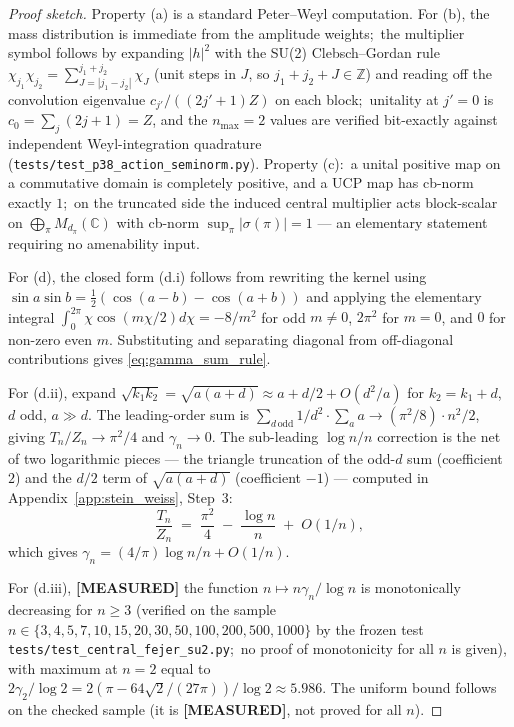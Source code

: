 \documentclass[11pt,a4paper]{article}
\theoremstyle{plain}
\theoremstyle{definition}
\newcommand{\nmax}{n_{\max}}
\newcommand{\C}{\mathbb{C}}
\newcommand{\Mat}{M}
\begin{document}
\begin{proof}[Proof sketch]
Property (a) is a standard Peter--Weyl computation. For (b), the mass
distribution is immediate from the amplitude weights;\ the multiplier
symbol follows by expanding $|h|^{2}$ with the SU(2) Clebsch--Gordan
rule $\chi_{j_1}\chi_{j_2} = \sum_{J = |j_1 - j_2|}^{j_1+j_2}\chi_{J}$
(unit steps in $J$, so $j_1 + j_2 + J \in \mathbb{Z}$)
and reading off the convolution eigenvalue
$c_{j'}/((2j'+1)Z)$ on each block;\ unitality at $j' = 0$ is
$c_{0} = \sum_{j}(2j+1) = Z$, and the $\nmax = 2$ values are verified
bit-exactly against independent Weyl-integration quadrature
(\texttt{tests/test\_p38\_action\_seminorm.py}). Property (c):\ a unital positive map on a
commutative domain is completely positive, and a UCP map has cb-norm
exactly $1$;\ on the truncated side the induced central multiplier
acts block-scalar on $\bigoplus_{\pi}\Mat_{d_{\pi}}(\C)$ with cb-norm
$\sup_{\pi}|\sigma(\pi)| = 1$ — an elementary statement requiring no
amenability input.

For (d), the closed form (d.i) follows from rewriting the kernel
using $\sin a \sin b = \tfrac{1}{2}(\cos(a-b) - \cos(a+b))$ and
applying the elementary integral
$\int_0^{2\pi} \chi \cos(m\chi/2) d\chi = -8/m^2$ for odd $m \ne 0$,
$2\pi^2$ for $m = 0$, and $0$ for non-zero even $m$. Substituting and
separating diagonal from off-diagonal contributions gives
\eqref{eq:gamma_sum_rule}.

For (d.ii), expand
$\sqrt{k_1 k_2} = \sqrt{a(a+d)} \approx a + d/2 + O(d^2/a)$ for
$k_2 = k_1 + d$, $d$ odd, $a \gg d$. The leading-order sum is
$\sum_{d\,\mathrm{odd}} 1/d^2 \cdot \sum_a a \to (\pi^2/8) \cdot
n^2/2$, giving $T_n / Z_n \to \pi^2/4$ and $\gamma_n \to 0$. The
sub-leading $\log n / n$ correction is the net of two logarithmic
pieces --- the triangle truncation of the odd-$d$ sum (coefficient
$2$) and the $d/2$ term of $\sqrt{a(a+d)}$ (coefficient $-1$) ---
computed in Appendix~\ref{app:stein_weiss}, Step~3:
\begin{equation*}
   \frac{T_n}{Z_n}
   \;=\; \frac{\pi^2}{4} \;-\; \frac{\log n}{n} \;+\; O(1/n),
\end{equation*}
which gives $\gamma_n = (4/\pi) \log n / n + O(1/n)$.

For (d.iii), \textbf{[MEASURED]} the function
$n \mapsto n \gamma_n / \log n$ is
monotonically decreasing for $n \ge 3$ (verified on the sample $n \in
\{3, 4, 5, 7, 10, 15, 20, 30, 50, 100, 200, 500, 1000\}$ by the frozen
test \texttt{tests/test\_central\_fejer\_su2.py};\ no proof of
monotonicity for all $n$ is given),
with maximum at $n = 2$ equal to
$2 \gamma_2 / \log 2 = 2(\pi - 64\sqrt{2}/(27\pi)) / \log 2
\approx 5.986$. The uniform bound follows on the checked sample (it is \textbf{[MEASURED]}, not proved for all $n$).
\end{proof}
\end{document}
